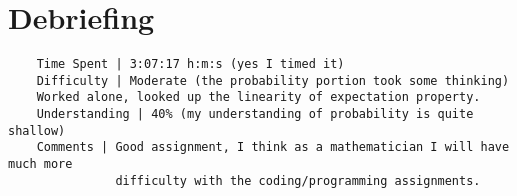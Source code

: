 \documentclass{article}
\theoremstyle{definition}
\begin{document}
\section{Debriefing}
\begin{verbatim}
    Time Spent | 3:07:17 h:m:s (yes I timed it)
    Difficulty | Moderate (the probability portion took some thinking)
    Worked alone, looked up the linearity of expectation property.
    Understanding | 40% (my understanding of probability is quite shallow)
    Comments | Good assignment, I think as a mathematician I will have much more 
               difficulty with the coding/programming assignments.
\end{verbatim}
\end{document}
